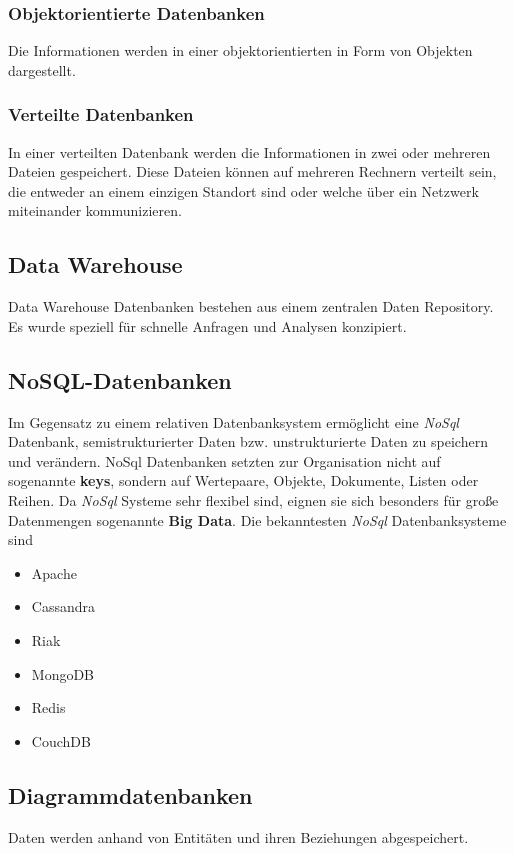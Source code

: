 \subsubsection{Objektorientierte Datenbanken}
Die Informationen werden in einer objektorientierten in Form von Objekten dargestellt.

\subsubsection{Verteilte Datenbanken}
In einer verteilten Datenbank werden die Informationen in zwei oder mehreren Dateien gespeichert.
Diese Dateien können auf mehreren Rechnern verteilt sein, die entweder an einem einzigen Standort
sind oder welche über ein Netzwerk miteinander kommunizieren.

\subsection{Data Warehouse}
Data Warehouse Datenbanken bestehen aus einem zentralen Daten Repository. Es wurde speziell für
schnelle Anfragen und Analysen konzipiert.

\subsection{NoSQL-Datenbanken}
Im Gegensatz zu einem relativen Datenbanksystem ermöglicht eine \textit{NoSql} Datenbank,
semistrukturierter Daten bzw. unstrukturierte Daten zu speichern und verändern. NoSql Datenbanken
setzten zur Organisation nicht auf sogenannte \textbf{keys}, sondern auf Wertepaare, Objekte, Dokumente,
Listen oder Reihen. Da \textit{NoSql} Systeme sehr flexibel sind, eignen sie sich
besonders für große Datenmengen sogenannte \textbf{Big Data}. Die bekanntesten
\textit{NoSql} Datenbanksysteme sind
\begin{itemize}
    \item Apache
    \item Cassandra
    \item Riak
    \item MongoDB
    \item Redis
    \item CouchDB
\end{itemize}

\subsection{Diagrammdatenbanken}
Daten werden anhand von Entitäten und ihren Beziehungen abgespeichert.

